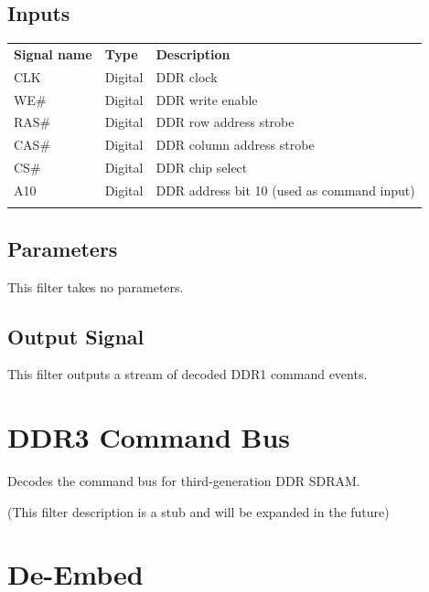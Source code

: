 \subsection{Inputs}

\begin{tabularx}{16cm}{llX}
\thickhline
\textbf{Signal name} & \textbf{Type} & \textbf{Description} \\
\thickhline
CLK & Digital & DDR clock\\
\thinhline
WE\# & Digital & DDR write enable\\
\thinhline
RAS\# & Digital & DDR row address strobe\\
\thinhline
CAS\# & Digital & DDR column address strobe\\
\thinhline
CS\# & Digital & DDR chip select\\
\thinhline
A10 & Digital & DDR address bit 10 (used as command input)\\
\thickhline
\end{tabularx}

\subsection{Parameters}

This filter takes no parameters.

\subsection{Output Signal}

This filter outputs a stream of decoded DDR1 command events.

\pagebreak
\section{DDR3 Command Bus}

Decodes the command bus for third-generation DDR SDRAM.

(This filter description is a stub and will be expanded in the future)

\pagebreak
\section{De-Embed}
\label{filter:deembed}

